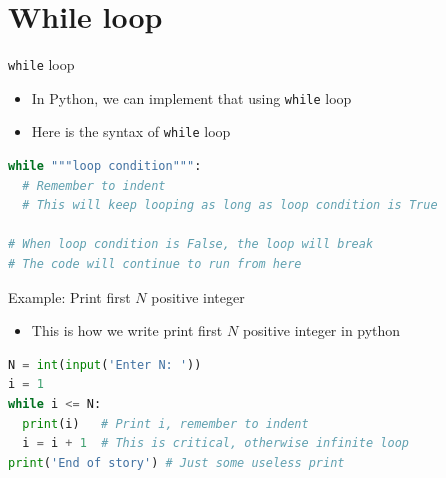 \documentclass[10pt,xcolor={table,dvipsnames},t]{beamer}
\begin{document}
\section{While loop}
\begin{frame}[fragile]{\texttt{while} loop}
  \begin{itemize}
    \item In Python, we can implement that using \texttt{while} loop 
    \item Here is the syntax of \texttt{while} loop 
  \end{itemize}
\begin{lstlisting}[language=python]
while """loop condition""":
  # Remember to indent
  # This will keep looping as long as loop condition is True

# When loop condition is False, the loop will break 
# The code will continue to run from here
\end{lstlisting}
\end{frame}

\begin{frame}[fragile]{Example: Print first $N$ positive integer}
  \begin{itemize}
    \item This is how we write print first $N$ positive integer in python
  \end{itemize}
\begin{lstlisting}[language=python]
N = int(input('Enter N: '))
i = 1
while i <= N:
  print(i)   # Print i, remember to indent
  i = i + 1  # This is critical, otherwise infinite loop
print('End of story') # Just some useless print 
\end{lstlisting}
\end{frame}


\end{document}
